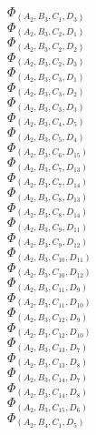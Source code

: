 \documentclass[14pt]{article}
\begin{document}
    $\Phi_{({A}_{2}, {B}_{3}, {C}_{1}, {D}_{3})}$ \\ 
    $\Phi_{({A}_{2}, {B}_{3}, {C}_{2}, {D}_{1})}$ \\ 
    $\Phi_{({A}_{2}, {B}_{3}, {C}_{2}, {D}_{2})}$ \\ 
    $\Phi_{({A}_{2}, {B}_{3}, {C}_{2}, {D}_{3})}$ \\ 
    $\Phi_{({A}_{2}, {B}_{3}, {C}_{3}, {D}_{1})}$ \\ 
    $\Phi_{({A}_{2}, {B}_{3}, {C}_{3}, {D}_{2})}$ \\ 
    $\Phi_{({A}_{2}, {B}_{3}, {C}_{3}, {D}_{3})}$ \\ 
    $\Phi_{({A}_{2}, {B}_{3}, {C}_{4}, {D}_{5})}$ \\ 
    $\Phi_{({A}_{2}, {B}_{3}, {C}_{5}, {D}_{4})}$ \\ 
    $\Phi_{({A}_{2}, {B}_{3}, {C}_{6}, {D}_{15})}$ \\ 
    $\Phi_{({A}_{2}, {B}_{3}, {C}_{7}, {D}_{13})}$ \\ 
    $\Phi_{({A}_{2}, {B}_{3}, {C}_{7}, {D}_{14})}$ \\ 
    $\Phi_{({A}_{2}, {B}_{3}, {C}_{8}, {D}_{13})}$ \\ 
    $\Phi_{({A}_{2}, {B}_{3}, {C}_{8}, {D}_{14})}$ \\ 
    $\Phi_{({A}_{2}, {B}_{3}, {C}_{9}, {D}_{11})}$ \\ 
    $\Phi_{({A}_{2}, {B}_{3}, {C}_{9}, {D}_{12})}$ \\ 
    $\Phi_{({A}_{2}, {B}_{3}, {C}_{10}, {D}_{11})}$ \\ 
    $\Phi_{({A}_{2}, {B}_{3}, {C}_{10}, {D}_{12})}$ \\ 
    $\Phi_{({A}_{2}, {B}_{3}, {C}_{11}, {D}_{9})}$ \\ 
    $\Phi_{({A}_{2}, {B}_{3}, {C}_{11}, {D}_{10})}$ \\ 
    $\Phi_{({A}_{2}, {B}_{3}, {C}_{12}, {D}_{9})}$ \\ 
    $\Phi_{({A}_{2}, {B}_{3}, {C}_{12}, {D}_{10})}$ \\ 
    $\Phi_{({A}_{2}, {B}_{3}, {C}_{13}, {D}_{7})}$ \\ 
    $\Phi_{({A}_{2}, {B}_{3}, {C}_{13}, {D}_{8})}$ \\ 
    $\Phi_{({A}_{2}, {B}_{3}, {C}_{14}, {D}_{7})}$ \\ 
    $\Phi_{({A}_{2}, {B}_{3}, {C}_{14}, {D}_{8})}$ \\ 
    $\Phi_{({A}_{2}, {B}_{3}, {C}_{15}, {D}_{6})}$ \\ 
    $\Phi_{({A}_{2}, {B}_{4}, {C}_{1}, {D}_{5})}$ \\ 
\end{document}
